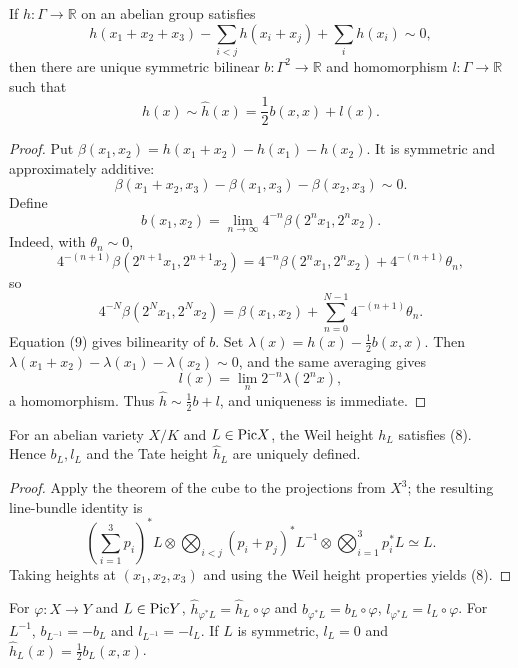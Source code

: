 \begin{lemma}
\label{mumford-lem-approximate-quadratic}
If $h:\Gamma\to\mathbb R$ on an abelian group satisfies
\[
h(x_1+x_2+x_3)-\sum_{i<j}h(x_i+x_j)+\sum_i h(x_i)\sim0,\tag{8}
\]
then there are unique symmetric bilinear $b:\Gamma^2\to\mathbb R$ and
homomorphism $l:\Gamma\to\mathbb R$ such that
\[
h(x)\sim\widehat h(x)=\frac12b(x,x)+l(x).
\]
\end{lemma}
\begin{proof}
Put $\beta(x_1,x_2)=h(x_1+x_2)-h(x_1)-h(x_2)$. It is symmetric and
approximately additive:
\[
\beta(x_1+x_2,x_3)-\beta(x_1,x_3)-\beta(x_2,x_3)\sim0.\tag{9}
\]
Define
\[
b(x_1,x_2)=\lim_{n\to\infty}4^{-n}\beta(2^nx_1,2^nx_2).
\]
Indeed, with $\theta_n\sim0$,
\[
4^{-(n+1)}\beta(2^{n+1}x_1,2^{n+1}x_2)=
4^{-n}\beta(2^nx_1,2^nx_2)+4^{-(n+1)}\theta_n,
\]
so
\[
4^{-N}\beta(2^Nx_1,2^Nx_2)=\beta(x_1,x_2)+
\sum_{n=0}^{N-1}4^{-(n+1)}\theta_n.
\]
Equation (9) gives bilinearity of $b$. Set
$\lambda(x)=h(x)-\frac12b(x,x)$. Then
$\lambda(x_1+x_2)-\lambda(x_1)-\lambda(x_2)\sim0$, and the same averaging gives
\[
l(x)=\lim_n2^{-n}\lambda(2^nx),
\]
a homomorphism. Thus $\widehat h\sim\frac12b+l$, and uniqueness is immediate.

\end{proof}


\begin{lemma}
\label{mumford-lem-tate-height}
\label{mumford-lem-height-parallelogram}
For an abelian variety $X/K$ and $L\in{\rm Pic}X$, the Weil height $h_L$
satisfies (8). Hence $b_L,l_L$ and the Tate height $\widehat h_L$ are uniquely
defined.
\end{lemma}
\begin{proof}
Apply the theorem of the cube to the projections from $X^3$; the resulting
line-bundle identity is
\[
\left(\sum_{i=1}^3p_i\right)^*L\otimes
\bigotimes_{i<j}(p_i+p_j)^*L^{-1}\otimes\bigotimes_{i=1}^3p_i^*L\simeq L.
\]
Taking heights at $(x_1,x_2,x_3)$ and using the Weil height properties yields
(8).

\end{proof}


\begin{remark}
\label{mumford-rem-tate-height-functoriality}
For $\varphi:X\to Y$ and $L\in{\rm Pic}Y$,
$\widehat h_{\varphi^*L}=\widehat h_L\circ\varphi$ and
$b_{\varphi^*L}=b_L\circ\varphi$, $l_{\varphi^*L}=l_L\circ\varphi$.
For $L^{-1}$, $b_{L^{-1}}=-b_L$ and $l_{L^{-1}}=-l_L$. If $L$ is symmetric,
$l_L=0$ and $\widehat h_L(x)=\frac12b_L(x,x)$.
\end{remark}

